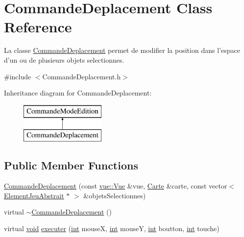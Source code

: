 \hypertarget{class_commande_deplacement}{\section{Commande\-Deplacement Class Reference}
\label{class_commande_deplacement}
}


La classe \hyperlink{class_commande_deplacement}{Commande\-Deplacement} permet de modifier la position dans l'espace d'un ou de plusieurs objets selectionnes.  




{\ttfamily \#include $<$Commande\-Deplacement.\-h$>$}

Inheritance diagram for Commande\-Deplacement\-:\begin{figure}[H]
\begin{center}
\leavevmode
\includegraphics[height=2.000000cm]{class_commande_deplacement}
\end{center}
\end{figure}
\subsection*{Public Member Functions}
\begin{DoxyCompactItemize}
\item 
\hyperlink{class_commande_deplacement_a4a68767331241858637dc60272c11d1e}{Commande\-Deplacement} (const \hyperlink{classvue_1_1_vue}{vue\-::\-Vue} \&vue, \hyperlink{class_carte}{Carte} \&carte, const vector$<$ \hyperlink{class_element_jeu_abstrait}{Element\-Jeu\-Abstrait} $\ast$ $>$ \&objets\-Selectionnes)
\item 
virtual \hyperlink{class_commande_deplacement_af5fcff826a06cb9cf11645c7a551af27}{$\sim$\-Commande\-Deplacement} ()
\item 
virtual \hyperlink{wglew_8h_aeea6e3dfae3acf232096f57d2d57f084}{void} \hyperlink{class_commande_deplacement_a8a591ce694d95d57409f14597d0b1e9c}{executer} (\hyperlink{wglew_8h_a500a82aecba06f4550f6849b8099ca21}{int} mouse\-X, \hyperlink{wglew_8h_a500a82aecba06f4550f6849b8099ca21}{int} mouse\-Y, \hyperlink{wglew_8h_a500a82aecba06f4550f6849b8099ca21}{int} boutton, \hyperlink{wglew_8h_a500a82aecba06f4550f6849b8099ca21}{int} touche)
\end{DoxyCompactItemize}
